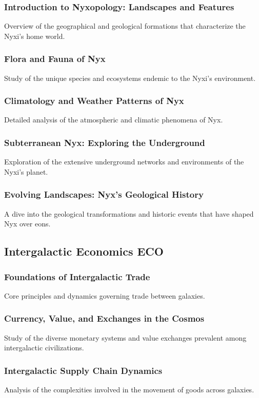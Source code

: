 \subsubsection{Introduction to Nyxopology: Landscapes and Features}
Overview of the geographical and geological formations that characterize the Nyxi's home world.
\subsubsection{Flora and Fauna of Nyx}
Study of the unique species and ecosystems endemic to the Nyxi's environment.
\subsubsection{Climatology and Weather Patterns of Nyx}
Detailed analysis of the atmospheric and climatic phenomena of Nyx.
\subsubsection{Subterranean Nyx: Exploring the Underground}
Exploration of the extensive underground networks and environments of the Nyxi's planet.
\subsubsection{Evolving Landscapes: Nyx's Geological History}
A dive into the geological transformations and historic events that have shaped Nyx over eons.


\subsection{Intergalactic Economics \hfill ECO}
\subsubsection{Foundations of Intergalactic Trade}
Core principles and dynamics governing trade between galaxies.
\subsubsection{Currency, Value, and Exchanges in the Cosmos}
Study of the diverse monetary systems and value exchanges prevalent among intergalactic civilizations.
\subsubsection{Intergalactic Supply Chain Dynamics}
Analysis of the complexities involved in the movement of goods across galaxies.

